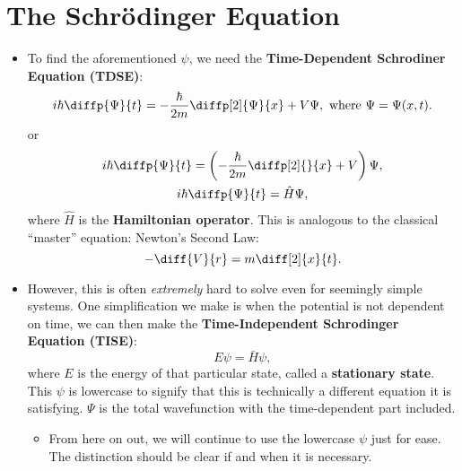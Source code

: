 \section{The Schr\"odinger Equation}



\begin{itemize}
    \item To find the aforementioned $\psi$, we need the \textbf{Time-Dependent Schrodiner Equation (TDSE)}:
        \begin{equation}
            i\hbar \diffp{\Psi}{t} = -\frac{\hbar}{2m} \diffp[2]{\Psi}{x} + V\Psi,\ \text{where}\ \Psi = \Psi(x, t).
        \end{equation}
        or
        \begin{gather}
            i\hbar \diffp{\Psi}{t} = \left(-\frac{\hbar}{2m}\diffp[2]{}{x} + V\right) \Psi, \\
            i\hbar \diffp{\Psi}{t} = \hat{H} \Psi,
        \end{gather}
        where $\hat{H}$ is the \textbf{Hamiltonian operator}. This is analogous to the classical ``master'' equation: Newton's Second Law:
        \begin{equation}
            -\diff{V}{r} = m\diff[2]{x}{t}.
        \end{equation}
    \item However, this is often \textit{extremely} hard to solve even for seemingly simple systems. One simplification we make is when the potential is not dependent on time, we can then make the \textbf{Time-Independent Schrodinger Equation (TISE)}:
        \begin{equation}
            E\psi = \bar{H}\psi,
        \end{equation}
        where $E$ is the energy of that particular state, called a \textbf{stationary state}. This $\psi$ is lowercase to signify that this is technically a different equation it is satisfying. $\Psi$ is the total wavefunction with the time-dependent part included.
        \begin{itemize}
            \item From here on out, we will continue to use the lowercase $\psi$ just for ease. The distinction should be clear if and when it is necessary.
        \end{itemize}
\end{itemize}



